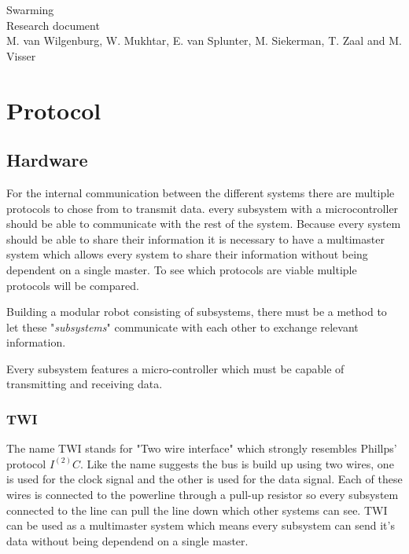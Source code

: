 \documentclass[10pt,a4paper]{article}
\begin{document}
\begin{titlepage}
    \centering
    \vfill
    {\Large

    Swarming\\

   
    {\small Research document}\\
        
        \vskip2cm
        {\small M. van Wilgenburg, W. Mukhtar, E. van Splunter, M. Siekerman, T. Zaal and M. Visser}\\
    }    
    \vfill
    
    \vfill
    \vfill
\end{titlepage}

\newpage

\listoffigures
\newpage

\listoftables
\newpage

\tableofcontents
\newpage


\section{Protocol}
\subsection{Hardware}

For the internal communication between the different systems there are multiple protocols to chose from to transmit data. every subsystem with a microcontroller should be able to communicate with the rest of the system. Because every system should be able to share their information it is necessary to have a multimaster system which allows every system to share their information without being dependent on a single master. To see which protocols are viable multiple protocols will be compared.

Building a modular robot consisting of subsystems, there must be a method to let these "\textit{subsystems}" communicate with each other to exchange relevant information. 

Every subsystem features a micro-controller which must be capable of transmitting and receiving data.  

\subsubsection{TWI}
The name TWI stands for "Two wire interface" which strongly resembles Phillps' protocol $I^(2)C$. Like the name suggests the bus is build up using two wires, one is used for the clock signal and the other is used for the data signal. Each of these wires is connected to the powerline through a pull-up resistor so every subsystem connected to the line can pull the line down which other systems can see. TWI can be used as a multimaster system which means every subsystem can send it's data without being dependend on a single master.
\end{document}

